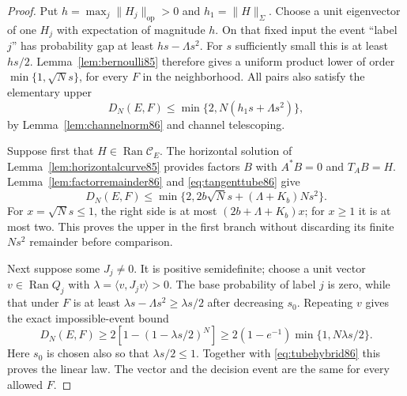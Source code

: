 \begin{proof}
Put $h=\max_j\|H_j\|_{\mathrm{op}}>0$ and
$h_1=\|H\|_{\Sigma}$.  Choose a unit eigenvector of one $H_j$
with expectation of magnitude $h$.  On that fixed input the event
``label $j$'' has probability gap at least $hs-\Lambda s^2$.
For $s$ sufficiently small this is at least $hs/2$.
Lemma~\ref{lem:bernoulli85} therefore gives a uniform product lower
of order $\min\{1,\sqrt N s\}$, for every $F$ in the neighborhood.
All pairs also satisfy the elementary upper
\begin{equation}\label{eq:tubehybrid86}
 D_N(E,F)\le\min\{2,N(h_1s+\Lambda s^2)\},
\end{equation}
by Lemma~\ref{lem:channelnorm86} and channel telescoping.

Suppose first that $H\in\operatorname{Ran}\mathcal C_E$.
The horizontal solution of Lemma~\ref{lem:horizontalcurve85}
provides factors $B$ with $A^*B=0$ and $T_AB=H$.
Lemma~\ref{lem:factorremainder86} and \eqref{eq:tangenttube86} give
\begin{equation}\label{eq:tubefiniteupper86}
 D_N(E,F)\le\min\{2,2b\sqrt N s+(\Lambda+K_b)Ns^2\}.
\end{equation}
For $x=\sqrt N s\le1$, the right side is at most
$(2b+\Lambda+K_b)x$; for $x\ge1$ it is at most two.
This proves the upper in the first branch without discarding its
finite $Ns^2$ remainder before comparison.

Next suppose some $J_j\ne0$.  It is positive semidefinite; choose a
unit vector $v\in\operatorname{Ran}Q_j$ with
$\lambda=\langle v,J_jv\rangle>0$.
The base probability of label $j$ is zero, while that under $F$ is
at least $\lambda s-\Lambda s^2\ge\lambda s/2$ after decreasing
$s_0$.  Repeating $v$ gives the exact impossible-event bound
\begin{equation}\label{eq:leakagelower86}
 D_N(E,F)\ge2\left[1-(1-\lambda s/2)^N\right]
 \ge2(1-e^{-1})\min\{1,N\lambda s/2\}.
\end{equation}
Here $s_0$ is chosen also so that $\lambda s/2\le1$.
Together with \eqref{eq:tubehybrid86} this proves the linear law.
The vector and the decision event are the same for every allowed $F$.


\end{proof}
